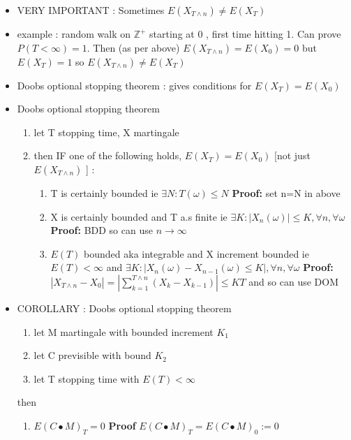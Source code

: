\documentclass[10pt,landscape,a4paper]{article}
\begin{document}
\begin{multicols*}{3}
\begin{spacing}{0.5}
\begin{itemize}
\item \colorbox{red!20}{VERY IMPORTANT : Sometimes $E \left (X_{T \wedge n} \right ) \neq E(X_{T})$}
\item example : random walk on $\mathbb{Z^+}$ starting at 0 ,  first time hitting 1. Can prove $P(T < \infty)=1$. Then (as per above) $E(X_{T \wedge n})=E(X_0)=0$  but $E(X_{T})=1$ so $E (X_{T \wedge n} ) \neq E(X_{T})$

\item \colorbox{green!10}{Doobs optional stopping theorem} : gives conditions for $E (X_{T} ) = E(X_{0})$

\item \colorbox{green!10}{Doobs optional stopping theorem}
\begin{enumerate}
\item let T stopping time, X martingale
\item then IF one of the following holds, $E(X_T)=E(X_0)$ [not just $E(X_{T \wedge n} )$ ] :

\begin{enumerate}

\item T is certainly bounded ie $\exists N :  T(\omega) \le N $ \textbf{Proof:} set n=N in above

\item X is certainly bounded and T a.s finite ie $\exists K : |X_n(\omega)| \le K, \forall n, \forall \omega$ \textbf{Proof:} BDD so can use $n \rightarrow \infty$

\item $E(T)$ bounded aka integrable  and X increment bounded ie $E(T) < \infty$ and $\exists K : |X_n(\omega)-X_{n-1}(\omega) \le K|, \forall n, \forall \omega$ \textbf{Proof:} $ | X_{T \wedge n} - X_0|=| \sum_{k=1}^{T \wedge n} (X_k - X_{k-1})| \le KT$ and so can use DOM

\end{enumerate}

\end{enumerate}

\item \colorbox{green!10}{COROLLARY : Doobs optional stopping theorem}
\begin{enumerate}
\item let M martingale with bounded increment $K_1$
\item let C previsible with bound $K_2$
\item let T stopping time with $E(T) < \infty$
\end{enumerate}
then
\begin{enumerate}[resume]
\item $E {(C \bullet M)}_T = 0$ \textbf{Proof} $E {(C \bullet M)}_T = E {(C \bullet M)}_0 := 0$
\end{enumerate}


\end{itemize}
\end{spacing}
\end{multicols*}
\end{document}
